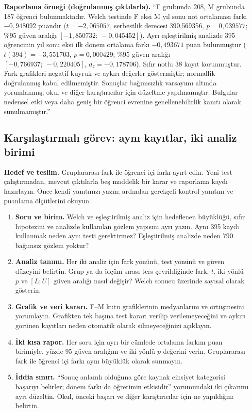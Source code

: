 \textbf{Raporlama örneği (doğrulanmış çıktılarla).}
``F grubunda 208, M grubunda 187 öğrenci bulunmaktadır. Welch testinde
F eksi M yıl sonu not ortalaması farkı $-0{,}948092$ puandır
($t=-2{,}065057$, serbestlik derecesi 390,569356,
$p=0{,}039577$; \%95 güven aralığı
$[-1{,}850732;\ -0{,}045452]$). Ayrı eşleştirilmiş analizde
395 öğrencinin yıl sonu eksi ilk dönem ortalama farkı $-0{,}493671$
puan bulunmuştur ($t(394)=-3{,}551703$, $p=0{,}000429$;
\%95 güven aralığı $[-0{,}766937;\ -0{,}220405]$,
$d_z=-0{,}178706$). Sıfır notlu 38 kayıt korunmuştur.
Fark grafikleri negatif kuyruk ve aykırı değerler göstermiştir;
normallik doğrulanmış kabul edilmemiştir. Sonuçlar bağımsızlık
varsayımı altında yorumlanmış; okul ve diğer karıştırıcılar için
düzeltme yapılmamıştır. Bulgular nedensel etki veya daha geniş
bir öğrenci evrenine genellenebilirlik kanıtı olarak sunulmamıştır.''


\subsection{Karşılaştırmalı görev: aynı kayıtlar, iki analiz birimi}
\label{sec:b11-karsilastirmali-gorev}

\textbf{Hedef ve teslim.} Gruplararası fark ile öğrenci içi farkı
ayırt edin. Yeni test çalıştırmadan, mevcut çıktılarla beş maddelik bir
karar ve raporlama kaydı hazırlayın. Önce kendi yanıtınızı yazın;
ardından gerekçeli kontrol yanıtını ve puanlama ölçütlerini okuyun.

\begin{enumerate}
  \item \textbf{Soru ve birim.} Welch ve eşleştirilmiş analiz için
  hedeflenen büyüklüğü, sıfır hipotezini ve analizde kullanılan gözlem
  yapısını ayrı yazın. Aynı 395 kaydı kullanmak neden aynı testi
  gerektirmez? Eşleştirilmiş analizde neden 790 bağımsız gözlem yoktur?
  \item \textbf{Analiz tanımı.} Her iki analiz için fark yönünü, test
  yönünü ve güven düzeyini belirtin. Grup ya da ölçüm sırası ters
  çevrildiğinde fark, $t$, iki yönlü $p$ ve $[L;U]$ güven aralığı
  nasıl değişir? Welch sonucu üzerinde sayısal olarak gösterin.
  \item \textbf{Grafik ve veri kararı.} F--M kutu grafiklerinin
  medyanlarını ve örtüşmesini yorumlayın. Grafikten tek başına test
  kararı verilip verilemeyeceğini ve aykırı görünen kayıtları neden
  otomatik olarak silmeyeceğinizi açıklayın.
  \item \textbf{İki kısa rapor.} Her soru için ayrı bir cümlede
  ortalama farkını puan birimiyle, yüzde 95 güven aralığını ve iki
  yönlü $p$ değerini verin. Gruplararası fark ile öğrenci içi farkı
  aynı büyüklük olarak sunmayın.
  \item \textbf{İddia sınırı.} ``Sonuç anlamlı olduğuna göre kaynak
  cinsiyet kategorisi başarıyı belirler; dönem farkı da öğretimin
  etkisidir'' yorumundaki iki çıkarımı ayrı düzeltin. Okul, önceki
  başarı ve diğer karıştırıcılar için ne yapıldığını belirtin.
\end{enumerate}

